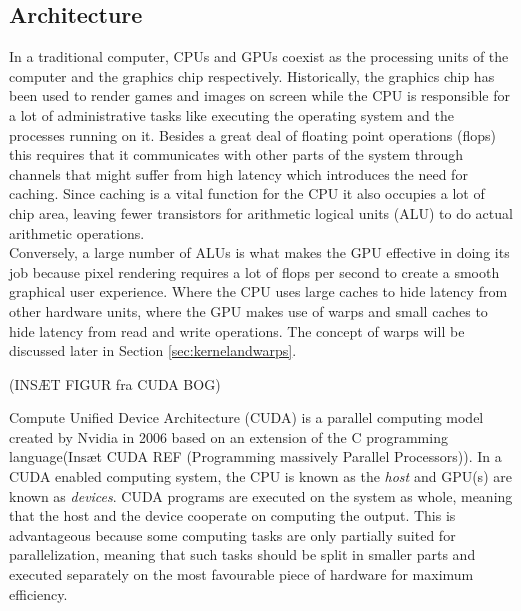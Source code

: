 
\subsection{Architecture}
In a traditional computer, CPUs and GPUs coexist as the processing units of the computer and the graphics chip respectively. Historically, the graphics chip has been used to render games and images on screen while the CPU is responsible for a lot of administrative tasks like executing the operating system and the processes running on it. Besides a great deal of floating point operations (flops) this requires that it communicates with other parts of the system through channels that might suffer from high latency which introduces the need for caching. Since caching is a vital function for the CPU it also occupies a lot of chip area, leaving fewer transistors for arithmetic logical units (ALU) to do actual arithmetic operations. \\

Conversely, a large number of ALUs is what makes the GPU effective in doing its job because pixel rendering requires a lot of flops per second to create a smooth graphical user experience. Where the CPU uses large caches to hide latency from other hardware units, where the GPU makes use of warps and small caches to hide latency from read and write operations. The concept of warps will be discussed later in Section \ref{sec:kernelandwarps}.

(INSÆT FIGUR fra CUDA BOG)

Compute Unified Device Architecture (CUDA) is a parallel computing model created by Nvidia in 2006 based on an extension of the C programming language(Insæt CUDA REF (Programming massively Parallel Processors)). In a CUDA enabled computing system, the CPU is known as the \emph{host} and GPU(s) are known as \emph{devices}. CUDA programs are executed on the system as whole, meaning that the host and the device cooperate on computing the output. This is advantageous because some computing tasks are only partially suited for parallelization, meaning that such tasks should be split in smaller parts and executed separately on the most favourable piece of hardware for maximum efficiency.\\


